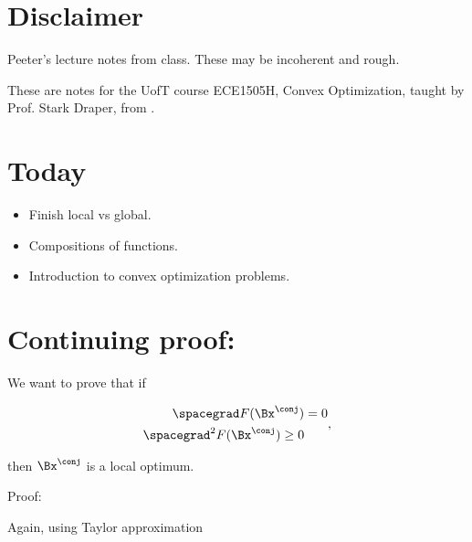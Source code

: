 
\renewcommand{\basename}{convexOptimization8}
\renewcommand{\dirname}{notes/ece1505/}
\newcommand{\keywords}{ECE1505H}


\usepackage{ece1505}
\usepackage{peeters_braket}
\usepackage{peeters_figures}
\usepackage{mathtools}
\usepackage{siunitx}
\usepackage{enumerate}

\beginArtNoToc
{}
\label{chap:convexOptimization8}

\section{Disclaimer}

Peeter's lecture notes from class.  These may be incoherent and rough.

These are notes for the UofT course ECE1505H, Convex Optimization, taught by Prof. Stark Draper, from \citep{boyd2004convex}.

\section{Today}

\begin{itemize}
\item Finish local vs global.
\item Compositions of functions.
\item Introduction to convex optimization problems.
\end{itemize}

\section{Continuing proof:}

We want to prove that if

\begin{equation*}
\begin{aligned}
\spacegrad F(\Bx^\conj) &= 0 \\
\spacegrad^2 F(\Bx^\conj) \ge 0
\end{aligned},
\end{equation*}

then \( \Bx^\conj\) is a local optimum.

Proof:

Again, using Taylor approximation

